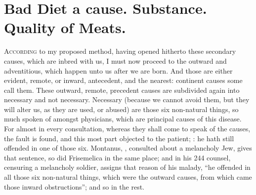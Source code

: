 \section[Bad Diet]{Bad Diet a cause. Substance. Quality of Meats.}\label{sec:bad-diet}

\lettrine{A}{ccording} to my proposed method, having opened hitherto these
secondary causes, which are inbred with us, I must now proceed to the outward
and adventitious, which happen unto us after we are born. And those are either
evident, remote, or inward, antecedent, and the nearest: continent causes some
call them. These outward, remote, precedent causes are subdivided again into
necessary and not necessary. Necessary (because we cannot avoid them, but they
will alter us, as they are used, or abused) are those six non-natural things,
so much spoken of amongst physicians, which are principal causes of this
disease. For almost in every consultation, whereas they shall come to speak of
the causes, the fault is found, and this most part objected to the patient;
: he hath still offended in one of
those six. Montanus, , consulted about a
melancholy Jew, gives that sentence, so did Frisemelica in the same place; and
in his 244 counsel, censuring a melancholy soldier, assigns that reason of his
malady, \enquote{he offended in all those six non-natural things,
which were the outward causes, from which came those inward obstructions}; and
so in the rest.

